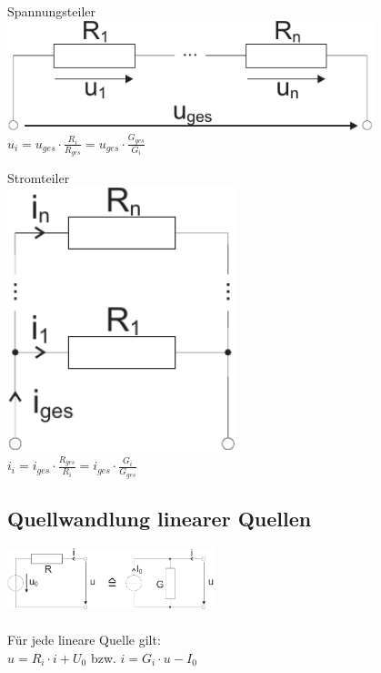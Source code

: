 \documentclass[a4paper,twocolumn,10pt]{article}
\begin{document}
\begin{minipage}[t]{0.23\textwidth}
\centering
Spannungsteiler\\
\vspace{0.3 cm}
\includegraphics[width=0.8\textwidth]{Grafiken/Spannungsteiler}\\
\vspace{0.5 cm}
$u_i=u_{ges}\cdot \frac{R_i}{R_{ges}}=u_{ges}\cdot \frac{G_{ges}}{G_i}$
\end{minipage}
\hfill
\begin{minipage}[t]{0.23\textwidth}
\centering
Stromteiler\\
\vspace{0.3 cm}
\includegraphics[width=0.5\textwidth]{Grafiken/Stromteiler}\\
\vspace{0.5 cm}
$i_i=i_{ges}\cdot \frac{R_{ges}}{R_i}=i_{ges}\cdot \frac{G_i}{G_{ges}}$
\end{minipage}

\subsection*{Quellwandlung linearer Quellen}
\includegraphics[width=0.45\textwidth]{Grafiken/Quellwandlung}\\\\
Für jede lineare Quelle gilt:\\
$u=R_i\cdot i+U_0$ bzw. $i=G_i\cdot u-I_0$
\end{document}
